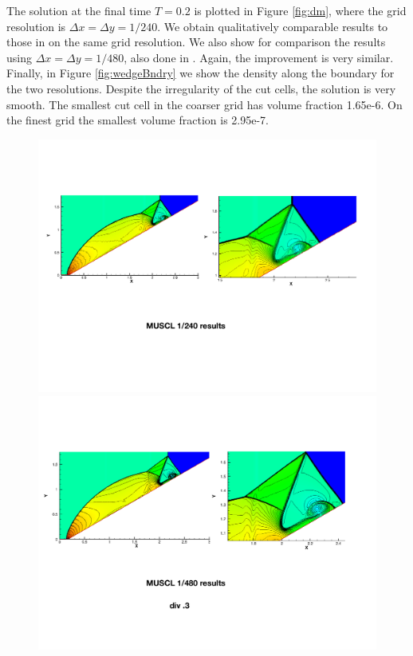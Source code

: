 The solution at the final time $T = 0.2$ is plotted in Figure \ref{fig:dm}, 
where the grid resolution is $\Delta x = \Delta y = 1/240$.
We obtain qualitatively comparable results to those in \cite{rkdg5} on 
the same grid resolution. We also show for comparison the results using 
$\Delta x = \Delta y = 1/480$, also done in \cite{rkdg5}. Again, the
improvement is very similar. Finally, in Figure \ref{fig:wedgeBndry} we
show the density along the boundary for the two resolutions. Despite the
irregularity of the cut cells, the solution is very smooth. The smallest
cut cell in the coarser grid has volume fraction 1.65e-6. On the finest
grid the smallest volume fraction is 2.95e-7. 

\begin{figure}[h]
\centering
\begin{center}
\hspace*{-.25in}
\includegraphics[width=1.1\linewidth]{figs/doubleMach240.pdf}
\includegraphics[width=1.1\linewidth]{figs/doubleMach480.pdf}

\end{center}
\end{figure}
